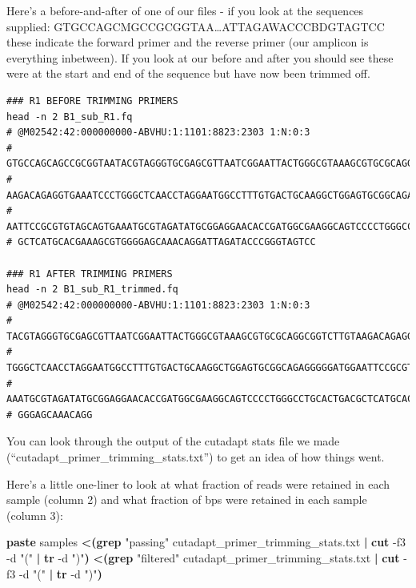 \documentclass[
]{book}
\newenvironment{Shaded}{\begin{snugshade}}{\end{snugshade}}
\newcommand{\AttributeTok}[1]{\textcolor[rgb]{0.13,0.29,0.53}{#1}}
\newcommand{\FunctionTok}[1]{\textcolor[rgb]{0.13,0.29,0.53}{\textbf{#1}}}
\newcommand{\KeywordTok}[1]{\textcolor[rgb]{0.13,0.29,0.53}{\textbf{#1}}}
\newcommand{\NormalTok}[1]{#1}
\newcommand{\OperatorTok}[1]{\textcolor[rgb]{0.81,0.36,0.00}{\textbf{#1}}}
\newcommand{\StringTok}[1]{\textcolor[rgb]{0.31,0.60,0.02}{#1}}
\begin{document}
Here's a before-and-after of one of our files - if you look at the sequences supplied: GTGCCAGCMGCCGCGGTAA\ldots ATTAGAWACCCBDGTAGTCC these indicate the forward primer and the reverse primer (our amplicon is everything inbetween). If you look at our before and after you should see these were at the start and end of the sequence but have now been trimmed off.

\begin{verbatim}
### R1 BEFORE TRIMMING PRIMERS
head -n 2 B1_sub_R1.fq
# @M02542:42:000000000-ABVHU:1:1101:8823:2303 1:N:0:3
# GTGCCAGCAGCCGCGGTAATACGTAGGGTGCGAGCGTTAATCGGAATTACTGGGCGTAAAGCGTGCGCAGGCGGTCTTGT
# AAGACAGAGGTGAAATCCCTGGGCTCAACCTAGGAATGGCCTTTGTGACTGCAAGGCTGGAGTGCGGCAGAGGGGGATGG
# AATTCCGCGTGTAGCAGTGAAATGCGTAGATATGCGGAGGAACACCGATGGCGAAGGCAGTCCCCTGGGCCTGCACTGAC
# GCTCATGCACGAAAGCGTGGGGAGCAAACAGGATTAGATACCCGGGTAGTCC

### R1 AFTER TRIMMING PRIMERS
head -n 2 B1_sub_R1_trimmed.fq
# @M02542:42:000000000-ABVHU:1:1101:8823:2303 1:N:0:3
# TACGTAGGGTGCGAGCGTTAATCGGAATTACTGGGCGTAAAGCGTGCGCAGGCGGTCTTGTAAGACAGAGGTGAAATCCC
# TGGGCTCAACCTAGGAATGGCCTTTGTGACTGCAAGGCTGGAGTGCGGCAGAGGGGGATGGAATTCCGCGTGTAGCAGTG
# AAATGCGTAGATATGCGGAGGAACACCGATGGCGAAGGCAGTCCCCTGGGCCTGCACTGACGCTCATGCACGAAAGCGTG
# GGGAGCAAACAGG
\end{verbatim}

You can look through the output of the cutadapt stats file we made (``cutadapt\_primer\_trimming\_stats.txt'') to get an idea of how things went.

Here's a little one-liner to look at what fraction of reads were retained in each sample (column 2) and what fraction of bps were retained in each sample (column 3):

\begin{Shaded}
\begin{Highlighting}[]
    \FunctionTok{paste}\NormalTok{ samples }\OperatorTok{\textless{}(}\FunctionTok{grep} \StringTok{"passing"}\NormalTok{ cutadapt\_primer\_trimming\_stats.txt }\KeywordTok{|} \FunctionTok{cut} \AttributeTok{{-}f3} \AttributeTok{{-}d} \StringTok{"("} \KeywordTok{|} \FunctionTok{tr} \AttributeTok{{-}d} \StringTok{")"}\OperatorTok{)} \OperatorTok{\textless{}(}\FunctionTok{grep} \StringTok{"filtered"}\NormalTok{ cutadapt\_primer\_trimming\_stats.txt }\KeywordTok{|} \FunctionTok{cut} \AttributeTok{{-}f3} \AttributeTok{{-}d} \StringTok{"("} \KeywordTok{|} \FunctionTok{tr} \AttributeTok{{-}d} \StringTok{")"}\OperatorTok{)}
\end{Highlighting}
\end{Shaded}
\end{document}
